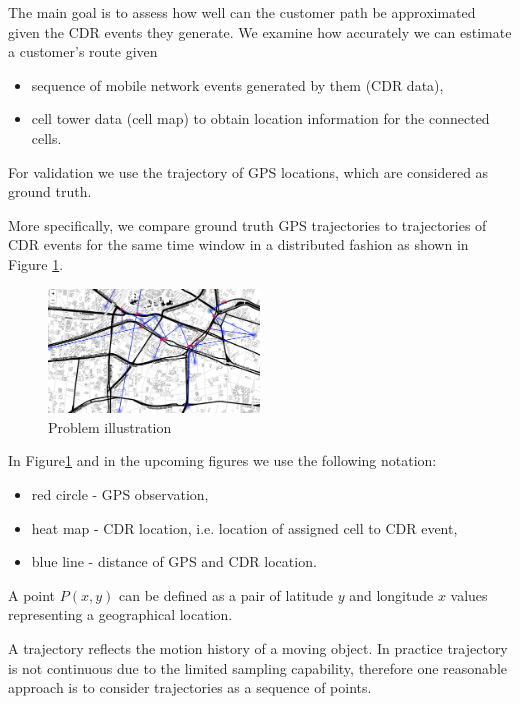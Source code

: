 The main goal is to assess how well can the customer path be approximated given the CDR events they generate.
We examine how accurately we can estimate a customer's route given
\begin{itemize}
    \item sequence of mobile network events generated by them (CDR data),
    \item cell tower data (cell map) to obtain location information for the connected cells.
\end{itemize}

For validation we use the trajectory of GPS locations, which are considered as ground truth.

More specifically, we compare ground truth GPS trajectories to trajectories of CDR events for the same time window in a distributed fashion as shown in Figure \ref{fig:problem}. 
\begin{figure}[h]
    \centering
    \includegraphics[width=0.5\textwidth]{images/localization_eval.png}
    \caption{Problem illustration}
    \label{fig:problem}
\end{figure}

In Figure\ref{fig:problem} and in the upcoming figures we use the following notation:
\begin{itemize}
    \item red circle - GPS observation,
    \item heat map - CDR location, i.e. location of assigned cell to CDR event,
    \item blue line - distance of GPS and CDR location.
\end{itemize}

\begin{definition}
A point $P(x,y)$ can be defined as a pair of latitude $y$ and longitude $x$ values representing a geographical location.
\end{definition}

A trajectory reflects the motion history of a moving object. In practice trajectory is not continuous due to the limited sampling capability, therefore one reasonable approach is to consider trajectories as a sequence of points.

